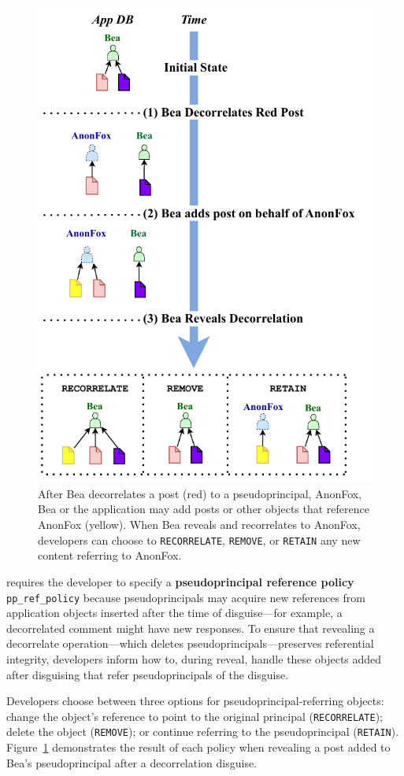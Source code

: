 \begin{figure}
    \centering
    \includegraphics[width=.7\textwidth]{figs/ppreveal_policies}
    \caption[\texttt{RECORRELATE}, \texttt{REMOVE}, and
    \texttt{RETAIN} policies maintain referential integrity for objects added after disguising that refer to
    a pseudoprincipal during reveal.]{After Bea decorrelates a post (red) to a pseudoprincipal,
    AnonFox, Bea or the application may add posts or other objects that
    reference AnonFox (yellow). When Bea reveals and recorrelates to AnonFox, developers
    can choose to \texttt{RECORRELATE}, \texttt{REMOVE}, or \texttt{RETAIN} any
    new content referring to AnonFox.}
\label{f:ppreveal}
\end{figure}
%

\sys requires the developer to specify a \textbf{pseudoprincipal reference
policy} \texttt{pp\_ref\_policy} because pseudoprincipals may acquire new references
from application objects inserted after the time of disguise---for example, a
decorrelated comment might have new responses. To ensure that revealing a
decorrelate operation---which deletes pseudoprincipals---preserves referential
integrity, developers inform \sys how to, during reveal, handle these objects
added after disguising that refer pseudoprincipals of the disguise.%

Developers choose between three options for
pseudoprincipal-referring objects: \one{} change the object's
reference to point to the original principal (\texttt{RECORRELATE});
\two{} delete the object (\texttt{REMOVE}); or \three{} continue
referring to the pseudoprincipal (\texttt{RETAIN}).
Figure~\ref{f:ppreveal} demonstrates the result of each policy when
revealing a post added to Bea's pseudoprincipal after a
decorrelation disguise.

